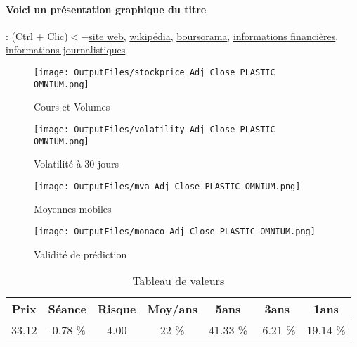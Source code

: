 \documentclass[11pt,a4paper]{report}%
\begin{document}
\paragraph{Voici un présentation graphique du titre} : (Ctrl + Clic)$<-$\href{http://www.plasticomnium.com/fr/investisseurs.html}{site web}, \href{https://fr.wikipedia.org/wiki/Plastic_Omnium}{wikipédia}, \href{https://www.boursorama.com/cours/1rPPOM/}{boursorama}, \href{https://www.qwant.com/?q=site:https:%2f%2fwww.easybourse.com%2faction-societe%2fPLASTIC-OMNIUM&t=web&client=ext-firefox-hp}{informations financières}, \href{https://bourse.lerevenu.com/cours-de-bourse/fiche-valeur-synthese/PLASTIC-OMNIUM/POM-FR}{informations journalistiques}
\begin{figure}[!htb]
   \begin{minipage}{0.5\textwidth}
     \centering
     \texttt{[image: OutputFiles/stockprice\_Adj Close\_PLASTIC OMNIUM.png]}
     \caption{Cours et Volumes}\label{Fig:price_PLASTIC OMNIUM}
   \end{minipage}\hfill
   \begin{minipage}{0.5\textwidth}
     \centering
     \texttt{[image: OutputFiles/volatility\_Adj Close\_PLASTIC OMNIUM.png]}
     \caption{Volatilité à 30 jours}\label{Fig:volat_PLASTIC OMNIUM}
   \end{minipage}
\end{figure}
\begin{figure}[!htb]
   \begin{minipage}{0.5\textwidth}
     \centering
     \texttt{[image: OutputFiles/mva\_Adj Close\_PLASTIC OMNIUM.png]}
     \caption{Moyennes mobiles}\label{Fig:mva_PLASTIC OMNIUM}
   \end{minipage}\hfill
   \begin{minipage}{0.5\textwidth}
     \centering
     \texttt{[image: OutputFiles/monaco\_Adj Close\_PLASTIC OMNIUM.png]}
     \caption{Validité de prédiction}\label{Fig:prediction_PLASTIC OMNIUM}
   \end{minipage}
\end{figure}

\begin{table}[H]
  \centering
    \begin{tabular}{|c|c|c|c|c|c|c|}
    \hline
    Prix & Séance & Risque  & Moy/ans & 5ans & 3ans & 1ans \\
    \hline
    33.12 &    -0.78 \%    & 4.00 & 22 \% & 41.33 \% & -6.21 \% & 19.14 \% \\
    \hline
    \end{tabular}%
        \label{tab:table_PLASTIC OMNIUM}%
      \caption{Tableau de valeurs}
\end{table}%
\end{document}
